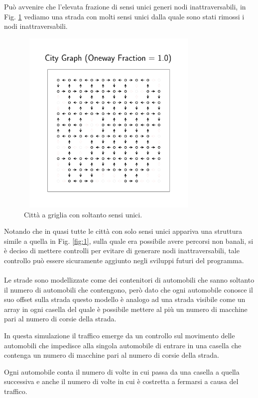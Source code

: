 \documentclass[main.tex]{subfiles}
\begin{document}
Può avvenire che l'elevata frazione di sensi unici generi nodi inattraversabili, in Fig. \ref{fig:2} vediamo una strada con molti sensi unici dalla
quale sono stati rimossi i nodi inattraversabili.

\begin{figure}[H]
    \centering
    \includegraphics[width=9cm, height=9cm]{city30.png}
    \caption{Città a griglia con soltanto sensi unici.}
    \label{fig:2}
\end{figure}

Notando che in quasi tutte le città con solo sensi unici appariva una struttura simile a quella in Fig. \ref{fig:1}, sulla quale era possibile avere 
percorsi non banali, si è deciso di mettere controlli per evitare di generare nodi inattraversabili, tale controllo può essere sicuramente aggiunto
negli sviluppi futuri del programma.\\
\hfill \\
Le strade sono modellizzate come dei contenitori di automobili che sanno soltanto il numero di automobili che contengono, però dato che ogni automobile conosce il suo offset sulla strada
questo modello è analogo ad una strada visibile come un array in ogni casella del quale è possibile mettere al più un numero di macchine pari al numero di corsie della strada.

In questa simulazione il traffico emerge da un controllo sul movimento delle automobili che impedisce
alla singola automobile di entrare in una casella che contenga un numero di macchine pari al numero di corsie della strada.

Ogni automobile conta il numero di volte in cui passa da una casella a quella successiva e anche il numero di volte in cui
è costretta a fermarsi a causa del traffico.
\end{document}
